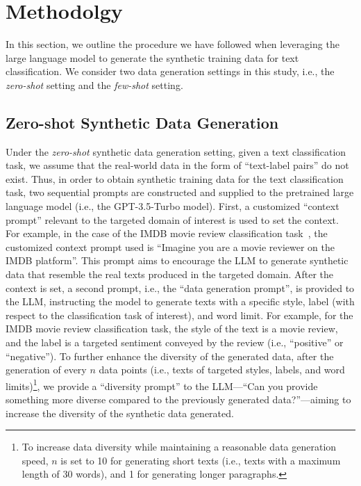 \section{Methodolgy}
In this section, we outline the procedure we have followed when leveraging the large language model  to generate the synthetic training data for text classification. We consider two data generation settings in this study, i.e., the \textit{zero-shot} setting and the \textit{few-shot} setting.

\subsection{Zero-shot Synthetic Data Generation}
\label{zero-shot}
Under the {\em zero-shot} synthetic data generation setting, given a text classification task, we assume that the real-world data in the form of ``text-label pairs'' do not exist. 
Thus, in order to obtain synthetic training data for the text classification task, two sequential prompts are constructed and supplied to the pretrained large language model (i.e., the GPT-3.5-Turbo model). First, a customized ``context prompt'' relevant to the targeted domain of interest is used to set the context. For example, in the case of the IMDB movie review classification task~\cite{maas-EtAl:2011:ACL-HLT2011}, the customized context prompt used is ``Imagine you are a movie reviewer on the IMDB platform''. This prompt aims to encourage the LLM to generate synthetic data that resemble the real texts produced in the targeted domain. 
After the context is set, a second prompt, i.e., the ``data generation prompt'', is provided to the LLM, instructing the model to generate texts with a specific style, label (with respect to the classification task of interest), and word limit. 
For example, for the IMDB movie review classification task, the style of the text is a movie review, and the label is a targeted sentiment conveyed by the review (i.e., ``positive'' or ``negative''). 
To further enhance the diversity of the generated data, after the generation of every $n$ data points (i.e., texts of targeted styles, labels, and word limits)\footnote{To increase data diversity while maintaining a reasonable data generation speed, $n$ is set to 10 for generating short texts (i.e., texts with a maximum length of 30 words), and 1 for generating longer paragraphs. 
},  %
we provide a ``diversity prompt'' to the LLM---``Can you provide something more diverse compared to the previously generated data?''---aiming to increase the diversity of the synthetic data generated.

